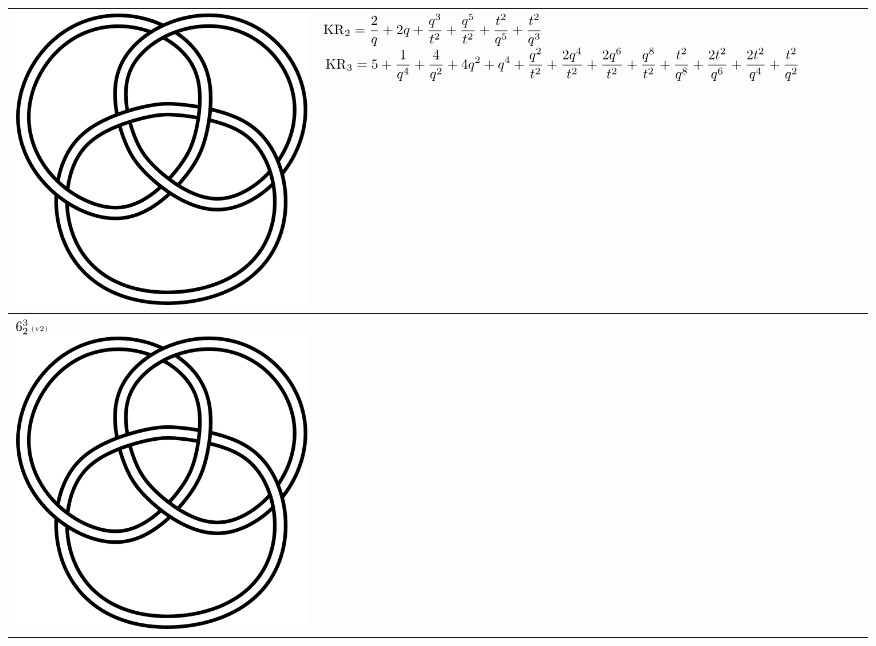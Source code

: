 \documentclass{compositio}
\theoremstyle{definition}
\numberwithin{equation}{section}
\begin{document}
{\begin{longtable}{p{}|p{}}
\includegraphics[scale=0.07,angle=0]{link6_2_3.pdf} 
& 
\newline
$
\displaystyle{%
\KR_{2} = \frac{2}{q}+2 q+\frac{q^3}{t^2}+\frac{q^5}{t^2}+\frac{t^2}{q^5}+\frac{t^2}{q^3}
}
$
\newline 
$
\displaystyle{%
\KR_{3} = 5+\frac{1}{q^4}+\frac{4}{q^2}+4 q^2+q^4+\frac{q^2}{t^2}+\frac{2 q^4}{t^2}+\frac{2 q^6}{t^2}+\frac{q^8}{t^2}+\frac{t^2}{q^8}+\frac{2 t^2}{q^6}+\frac{2 t^2}{q^4}+\frac{t^2}{q^2}
}
$
\newline
\\
\hline
$6_{2}^3\,\text{{\tiny (v2)}}$ 
\includegraphics[scale=0.07,angle=0]{link6_2_3.pdf} 

\end{longtable}}
\end{document}
